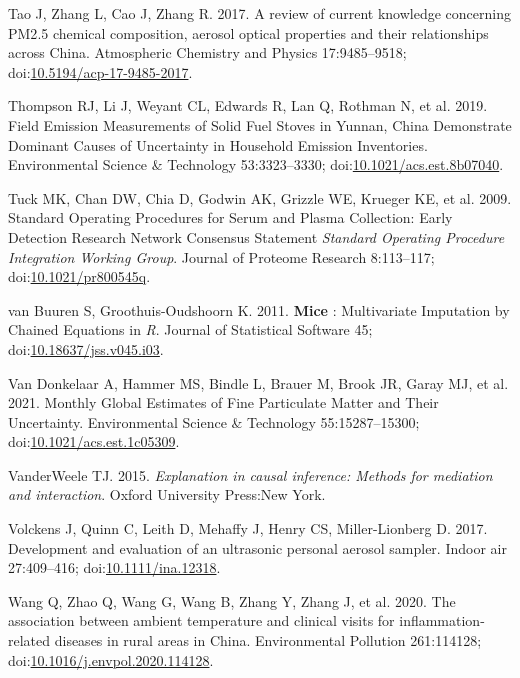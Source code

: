 \documentclass[
  letterpaper,
  DIV=11,
  numbers=noendperiod]{scrartcl}
\newlength{\cslhangindent}
\newenvironment{CSLReferences}[2] %
 {\begin{list}{}{%
  \setlength{\itemindent}{0pt}
  \setlength{\leftmargin}{0pt}
  \setlength{\parsep}{0pt}
  \ifodd #1
   \setlength{\leftmargin}{\cslhangindent}
   \setlength{\itemindent}{-1\cslhangindent}
  \fi
  \setlength{\itemsep}{#2\baselineskip}}}
 {\end{list}}
\begin{document}
\begin{CSLReferences}{1}{1}
Tao J, Zhang L, Cao J, Zhang R. 2017. A review of current knowledge
concerning {PM2}.5 chemical composition, aerosol optical properties and
their relationships across {China}. Atmospheric Chemistry and Physics
17:9485--9518;
doi:\href{https://doi.org/10.5194/acp-17-9485-2017}{10.5194/acp-17-9485-2017}.

Thompson RJ, Li J, Weyant CL, Edwards R, Lan Q, Rothman N, et al. 2019.
Field {Emission Measurements} of {Solid Fuel Stoves} in {Yunnan}, {China
Demonstrate Dominant Causes} of {Uncertainty} in {Household Emission
Inventories}. Environmental Science \& Technology 53:3323--3330;
doi:\href{https://doi.org/10.1021/acs.est.8b07040}{10.1021/acs.est.8b07040}.

Tuck MK, Chan DW, Chia D, Godwin AK, Grizzle WE, Krueger KE, et al.
2009. Standard {Operating Procedures} for {Serum} and {Plasma
Collection}: {Early Detection Research Network Consensus Statement}
{\emph{Standard Operating Procedure Integration Working Group}}. Journal
of Proteome Research 8:113--117;
doi:\href{https://doi.org/10.1021/pr800545q}{10.1021/pr800545q}.

van Buuren S, Groothuis-Oudshoorn K. 2011. {\textbf{Mice}} :
{Multivariate Imputation} by {Chained Equations} in {\emph{R}}. Journal
of Statistical Software 45;
doi:\href{https://doi.org/10.18637/jss.v045.i03}{10.18637/jss.v045.i03}.

Van Donkelaar A, Hammer MS, Bindle L, Brauer M, Brook JR, Garay MJ, et
al. 2021. Monthly {Global Estimates} of {Fine Particulate Matter} and
{Their Uncertainty}. Environmental Science \& Technology
55:15287--15300;
doi:\href{https://doi.org/10.1021/acs.est.1c05309}{10.1021/acs.est.1c05309}.

VanderWeele TJ. 2015. \emph{Explanation in causal inference: Methods for
mediation and interaction}. Oxford University Press:New York.

Volckens J, Quinn C, Leith D, Mehaffy J, Henry CS, Miller-Lionberg D.
2017. Development and evaluation of an ultrasonic personal aerosol
sampler. Indoor air 27:409--416;
doi:\href{https://doi.org/10.1111/ina.12318}{10.1111/ina.12318}.

Wang Q, Zhao Q, Wang G, Wang B, Zhang Y, Zhang J, et al. 2020. The
association between ambient temperature and clinical visits for
inflammation-related diseases in rural areas in {China}. Environmental
Pollution 261:114128;
doi:\href{https://doi.org/10.1016/j.envpol.2020.114128}{10.1016/j.envpol.2020.114128}.


\end{CSLReferences}
\end{document}
